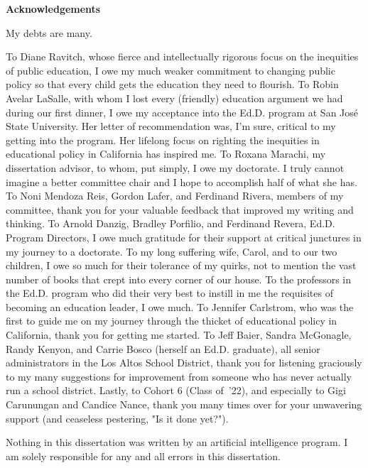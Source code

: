 
\begin{center}
  \textbf{Acknowledgements}\\
\end{center}

My debts are many.
  
To Diane Ravitch, whose fierce and intellectually rigorous focus on the inequities of public education, I owe my much weaker commitment to changing public policy so that every child gets the education they need to flourish. To Robin Avelar LaSalle, with whom I lost every (friendly) education argument we had during our first dinner, I owe my acceptance into the Ed.D. program at San José State University. Her letter of recommendation was, I'm sure, critical to my getting into the program. Her lifelong focus on righting the inequities in educational policy in California has inspired me. To Roxana Marachi, my dissertation advisor, to whom, put simply, I owe my doctorate. I truly cannot imagine a better committee chair and I hope to accomplish half of what she has. To Noni Mendoza Reis, Gordon Lafer, and Ferdinand Rivera, members of my committee, thank you for your valuable feedback that improved my writing and thinking. To Arnold Danzig, Bradley Porfilio, and Ferdinand Revera, Ed.D. Program Directors, I owe much gratitude for their support at critical junctures in my journey to a doctorate. To my long suffering wife, Carol, and to our two children, I owe so much for their tolerance of my quirks, not to mention the vast number of books that crept into every corner of our house. To the professors in the Ed.D. program who did their very best to instill in me the requisites of becoming an education leader, I owe much. To Jennifer Carlstrom, who was the first to guide me on my journey through the thicket of educational policy in California, thank you for getting me started. To Jeff Baier, Sandra McGonagle, Randy Kenyon, and Carrie Bosco (herself an Ed.D. graduate), all senior administrators in the Los Altos School District, thank you for listening graciously to my many suggestions for improvement from someone who has never actually run a school district. Lastly, to Cohort 6 (Class of '22), and especially to Gigi Carunungan and Candice Nance, thank you many times over for your unwavering support (and ceaseless pestering, "Is it done yet?").

Nothing in this dissertation was written by an artificial intelligence program. I am solely responsible for any and all errors in this dissertation.

